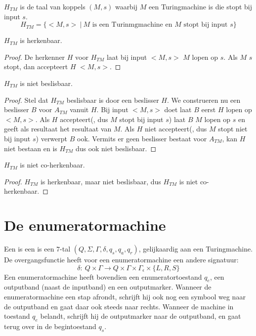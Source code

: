 \documentclass[main.tex]{subfiles}
\begin{document}
\begin{de}
  \label{de:h-tm}
  $H_{TM}$ is de taal van koppels $(M,s)$ waarbij $M$ een Turingmachine is die stopt bij input $s$.
  \[ H_{TM} = \{ <M,s> \ |\ M \text{ is een Turinmgmachine en } M \text{ stopt bij input } s \} \]
\end{de}

\begin{st}
  \label{st:h-tm-herk}
  $H_{TM}$ is herkenbaar.
  \begin{proof}
    De herkenner $H$ voor $H_{TM}$ laat bij input $<M,s>$ $M$ lopen op $s$.
    Als $M$ $s$ stopt, dan accepteert $H$ $<M,s>$.
  \end{proof}
\end{st}

\begin{st}
  \label{st:h-tm-niet-besl}
  $H_{TM}$ is niet beslisbaar.

  \begin{proof}
    Stel dat $H_{TM}$ beslisbaar is door een beslisser $H$.
    We construeren nu een beslisser $B$ voor $A_{TM}$ vanuit $H$.
    Bij input $<M,s>$ doet laat $B$ eerst $H$ lopen op $<M,s>$.
    Als $H$ accepteert(, dus $M$ stopt bij input $s$) laat $B$ $M$ lopen op $s$ en geeft als resultaat het resultaat van $M$.
    Als $H$ niet accepteert(, dus $M$ stopt niet bij input $s$) verwerpt $B$ ook.
    Vermits er geen beslisser bestaat voor $A_{TM}$, kan $H$ niet bestaan en is $H_{TM}$ dus ook niet beslisbaar.
  \end{proof}
\end{st}

\begin{gev}
  \label{gev:h-tm-niet-coherk}
  $H_{TM}$ is niet co-herkenbaar.
  \begin{proof}
    $H_{TM}$ is herkenbaar, maar niet beslisbaar, dus $H_{TM}$ is niet co-herkenbaar.
  \end{proof}
\end{gev}

\section{De enumeratormachine}
\label{sec:de-enumeratormachine}

\begin{de}
  Een  is een is een $7$-tal $(Q,\Sigma,\Gamma, \delta, q_{s}, q_{a}, q_{r})$, gelijkaardig aan een Turingmachine.
  De overgangsfunctie heeft voor een enumeratormachine een andere signatuur:
  \[ \delta:\ Q \times \Gamma \rightarrow Q \times \Gamma \times \Gamma_{\epsilon}\times \{L,R,S\} \]
  Een enumeratormachine heeft bovendien een enumeratortoestand $q_{e}$, een outputband (naast de inputband) en een outputmarker.
  Wanneer de enumeratormachine een stap afrondt, schrijft hij ook nog een symbool weg naar de outputband en gaat daar ook steeds naar rechts. Wanneer de machine in toestand $q_{e}$ belandt, schrijft hij de outputmarker naar de outputband, en gaat terug over in de begintoestand $q_{s}$.
\end{de}
\end{document}
